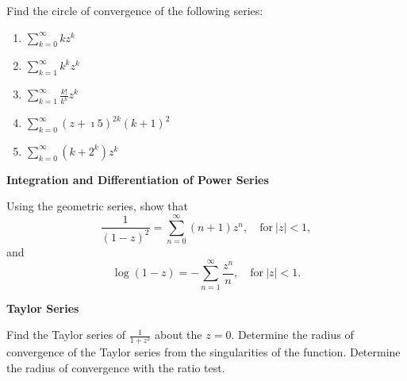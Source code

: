 {\begin{Exercise}
\end{Exercise}


\begin{Exercise}
  \label{exercise circle of convergence k zk}
  Find the circle of convergence of the following series:
  \begin{enumerate}
  \item 
    $\displaystyle \sum_{k = 0}^\infty k z^k$
  \item 
    $\displaystyle \sum_{k = 1}^\infty k^k z^k$
  \item 
    $\displaystyle \sum_{k = 1}^\infty \frac{k!}{k^k} z^k$
  \item 
    $\displaystyle \sum_{k = 0}^\infty (z + \imath 5)^{2 k} (k + 1)^2$
  \item 
    $\displaystyle \sum_{k=0}^\infty (k + 2^k) z^k$
  \end{enumerate}

\end{Exercise}



\begin{large}
  \noindent
  \textbf{Integration and Differentiation of Power Series}
\end{large}


\begin{Exercise}
  \label{exercise sum (n+1)z^n}
  Using the geometric series, show that
  \[ 
  \frac{1}{(1-z)^2} = \sum_{n = 0}^\infty (n+1) z^n, \quad \mathrm{for}\ |z| < 1, 
  \]
  and
  \[
  \log(1 - z) = - \sum_{n = 1}^\infty \frac{z^n}{n}, \quad \mathrm{for}\ |z| < 1.
  \]

\end{Exercise}


\begin{large}
  \noindent
  \textbf{Taylor Series}
\end{large}


\begin{Exercise}
  \label{exercise taylor 1/(1+z^2)}
  Find the Taylor series of $\frac{1}{1 + z^2}$ about the $z = 0$.
  Determine the radius of convergence of the Taylor series from the 
  singularities of the function.  Determine the radius of convergence with 
  the ratio test.

\end{Exercise}




}
